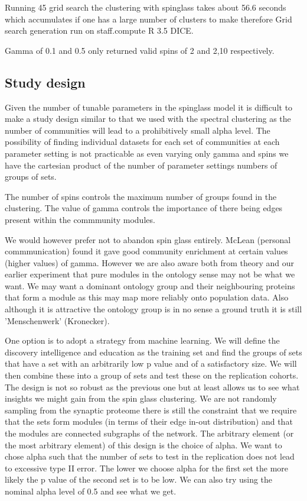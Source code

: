 Running 45 grid search the clustering with spinglass takes about 56.6 seconds which accumulates if one has a large number of clusters to make therefore Grid search generation run on staff.compute R 3.5 DICE.

Gamma of 0.1 and 0.5 only returned valid spins of 2 and 2,10 respectively. 
\subsection{Study design}
Given the number of tunable parameters in the spinglass model it is difficult to make a study design similar to that we used with the spectral clustering as the number of communities will lead to a prohibitively small alpha level. The possibility of finding individual datasets for each set of communities at each parameter setting is not practicable as even varying only gamma and spins we have the cartesian product of the number of parameter settings numbers of groups of sets.

The number of spins controls the maximum number of groups found in the clustering. The value of gamma controls the importance of there being edges present within the commmunity modules.

We would however prefer not to abandon spin glass entirely. McLean (personal commmunication) found it gave good community enrichment at certain values (higher values) of gamma. However we are also aware both from theory and our earlier experiment that pure modules in the ontology sense may not be what we want. We may want a dominant ontology group and their neighbouring proteins that form a module as this may map more reliably onto population data. Also although it is attractive the ontology group is in no sense a ground truth it is still 'Menschenwerk' (Kronecker).

One option is to adopt a strategy from machine learning. We will define the discovery intelligence and education as the training set and find the groups of sets that have a set with an arbitrarily low p value and of a satisfactory size. We will then combine these into a group of sets and test these on the replication cohorts. The design is not so robust as the previous one but at least allows us to see what insights we might gain from the spin glass clustering. We are not randomly sampling from the synaptic proteome there is still the constraint that we require that the sets form modules (in terms of their edge in-out distribution) and that the modules are connected subgraphs of the network. The arbitrary element (or the most arbitrary element) of this design is the choice of alpha. We want to chose alpha such that the number of sets to test in the replication does not lead to excessive type II error. The lower we choose alpha for the first set the more likely the p value of the second set is to be low. We can also try using the nominal alpha level of 0.5 and see what we get. 

